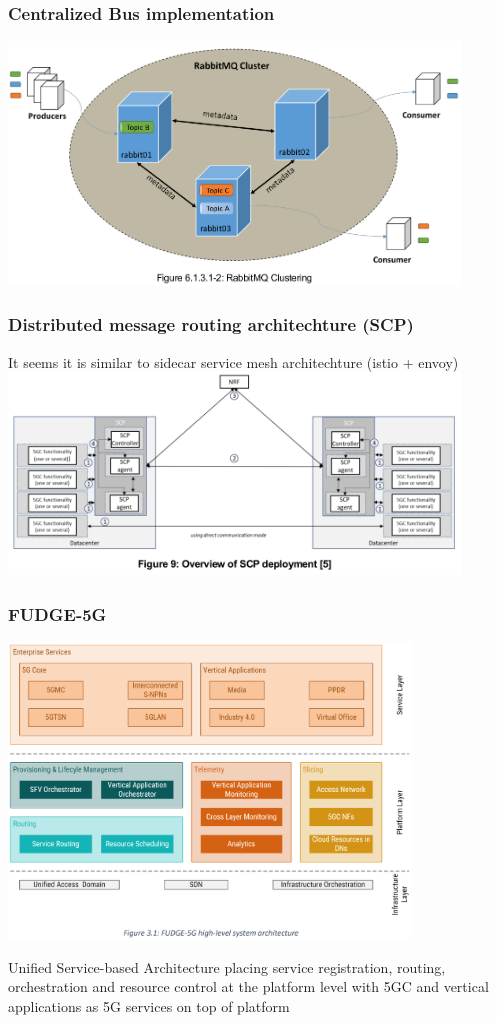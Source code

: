 \documentclass{beamer}
\begin{document}
\begin{frame}
  \frametitle{Centralized Bus implementation}
  \center
  \includegraphics[width=0.9\textwidth]{images/rabitmq}
\end{frame}

\begin{frame}
  \frametitle{Distributed message routing architechture (SCP)}
  It seems it is similar to sidecar service mesh architechture (istio + envoy)
  \center
  \includegraphics[width=0.9\textwidth]{images/scp-deploy}
\end{frame}

\begin{frame}
  \frametitle{FUDGE-5G}
  \begin{center}
  \includegraphics[width=0.8\textwidth]{images/fudge-5g}
  \end{center}
  \small Unified Service-based Architecture placing service
registration, routing, orchestration and resource control at the
platform level with 5GC and vertical applications as 5G
services on top of platform
\end{frame}
\end{document}
